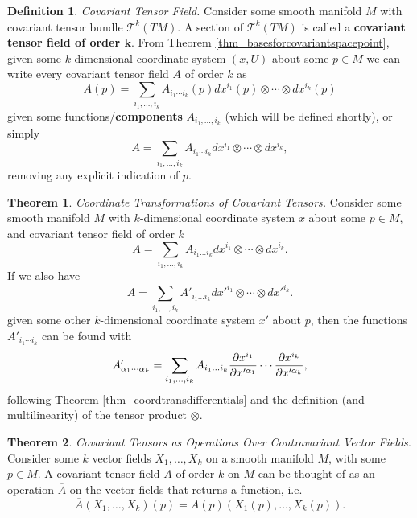 \documentclass[10pt,landscape]{article}
\theoremstyle{definition}
\newtheorem{definition}{Definition}[section]
\theoremstyle{theorem}
\newtheorem{theorem}{Theorem}[section]
\theoremstyle{summary}
\theoremstyle{remark}
\begin{document}
\begin{multicols*}{3}
\theoremstyle{definition}
\begin{definition}{\textit{Covariant Tensor Field.}}
    Consider some smooth manifold $M$ with covariant tensor bundle $\mathcal{T}^k(TM)$. A section of $\mathcal{T}^k(TM)$ is called a \textbf{covariant tensor field of order $\bm{k}$}. From Theorem \ref{thm_basesforcovariantspacepoint}, given some $k$-dimensional coordinate system $(x ,U)$ about some $p\in M$ we can write every covariant tensor field $A$ of order $k$ as
    \begin{equation}
        A(p) = \sum\limits_{i_1,\ldots,i_k}A_{i_1\cdots i_k}(p)dx^{i_1}(p)\otimes\cdots\otimes dx^{i_k}(p)
    \end{equation}
    given some functions/\textbf{components} $A_{i_1,\ldots,i_k}$ (which will be defined shortly), or simply
    \begin{equation}
        A = \sum\limits_{i_1,\ldots,i_k}A_{i_1\cdots i_k}dx^{i_1}\otimes\cdots\otimes dx^{i_k},
    \end{equation}
    removing any explicit indication of $p$.
\end{definition}

\theoremstyle{theorem}
\begin{theorem}{\textit{Coordinate Transformations of Covariant Tensors.}}
    \label{thm_covariantcoordtrans}
    Consider some smooth manifold $M$ with $k$-dimensional coordinate system $x$ about some $p\in M$, and covariant tensor field of order $k$
    \begin{equation}
        A = \sum\limits_{i_1,\ldots,i_k}A_{i_1\ldots i_k}dx^{i_1}\otimes\cdots\otimes dx^{i_k}.
    \end{equation}
    If we also have
    \begin{equation}
        A = \sum\limits_{i_1,\ldots,i_k}A'_{i_1\ldots i_k}dx'^{i_1}\otimes\cdots\otimes dx'^{i_k}.
    \end{equation}
    given some other $k$-dimensional coordinate system $x'$ about $p$, then the functions $A'_{i_1\cdots i_k}$ can be found with
    \begin{equation}
        A'_{\alpha_1\cdots\alpha_k} = \sum\limits_{i_1,\ldots,i_k}A_{i_1\ldots i_k} \pdv{x^{i_1}}{x'^{\alpha_1}}\cdots\pdv{x^{i_k}}{x'^{\alpha_k}},
    \end{equation}
    following Theorem \ref{thm_coordtransdifferentials} and the definition (and multilinearity) of the tensor product $\otimes$.
\end{theorem}

\theoremstyle{theorem}
\begin{theorem}{\textit{Covariant Tensors as Operations Over Contravariant Vector Fields.}}
    \label{thm_covtensorsoperations}
    Consider some $k$ vector fields $X_1,\ldots,X_k$ on a smooth manifold $M$, with some $p\in M$. A covariant tensor field $A$ of order $k$ on $M$ can be thought of as an operation $\overline{A}$ on the vector fields that returns a function, i.e.
    \begin{equation}
        \overline{A}(X_1,\ldots,X_k)(p) = A(p)(X_1(p),\ldots,X_k(p)).
    \end{equation}
    

\end{theorem}
\end{multicols*}
\end{document}
